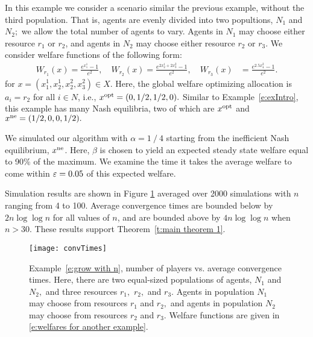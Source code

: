 \begin{example}\label{e:grow with n}

In this example we consider a scenario similar the previous example, without the third population. That is, agents are evenly divided into two popultions, $N_1$ and $N_2;$ we allow the total number of agents to vary. Agents in $N_1$ may choose either resource $r_1 $ or $r_2$, and agents in $N_2$ may choose either resource $r_2$ or $r_3.$
We consider welfare functions of the following form:
\begin{align}
W_{r_1}(x) = \frac{e^ {x_1^1} - 1}{e^ {2}},\quad
W_{r_2}(x) = \frac{e^{2x_2^1+2x_3^2} - 1}{e^ {2}},\quad
W_{r_3}(x) &= \frac{e^{2.5x_4^2} - 1}{e^ {2}}.\label{e:welfares for another example}
\end{align}
for $x = (x_1^1,x_2^1,x_2^2,x_3^2)\in X.$
Here, the global welfare optimizing allocation is $a_i = r_2$ for all $i\in N$, i.e., $x^{\rm opt} = (0,1/2,1/2,0).$   Similar to Example~\ref{e:exIntro}, this example has many Nash equilibria, two of which are $x^{\rm opt}$ and $x^{\rm ne} = (1/2,0,0,1/2).$

We simulated our algorithm with $\alpha = 1\mathop{/}4$ starting from the inefficient Nash equilibrium, $x^{\rm ne}$.  Here, $\beta$ is chosen to yield an expected steady state welfare equal to 90\% of the maximum. We examine the time it takes the average welfare to come within $\varepsilon = 0.05$ of this expected welfare.

Simulation results are shown in Figure \ref{f:convTimes} averaged over 2000 simulations with $n$ ranging from 4 to 100.  Average convergence times are bounded below by $2n\log\log n$ for all values of $n$, and are bounded above by $4n \log\log n$ when $n>30$.
These results support  Theorem~\ref{t:main theorem 1}.


\begin{figure}[ht]
  \centering
    \texttt{[image: convTimes]}
  \caption{Example~\ref{e:grow with n}, number of players vs. average convergence times. Here, there are two equal-sized populations of agents, $N_1$ and $N_2,$ and three resources $r_1,$ $r_2,$ and $r_3.$ 
Agents in population $N_1$ may choose from resources $r_1$ and $r_2,$ and agents in population $N_2$ may choose from resources $r_2$ and $r_3.$ Welfare functions are given in \eqref{e:welfares for another example}. \label{f:convTimes}}
\end{figure}


\end{example}


